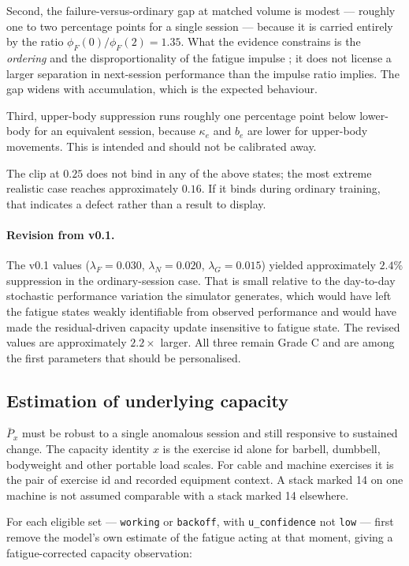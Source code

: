 \documentclass[11pt]{article}
\begin{document}
Second, the failure-versus-ordinary gap at matched volume is modest --- roughly one to two percentage points for a single session --- because it is carried entirely by the ratio $\phi_F(0)/\phi_F(2)=1.35$. What the evidence constrains is the \emph{ordering} and the disproportionality of the fatigue impulse \cite{moran2017}; it does not license a larger separation in next-session performance than the impulse ratio implies. The gap widens with accumulation, which is the expected behaviour.

Third, upper-body suppression runs roughly one percentage point below lower-body for an equivalent session, because $\kappa_e$ and $b_e$ are lower for upper-body movements. This is intended and should not be calibrated away.

The clip at $0.25$ does not bind in any of the above states; the most extreme realistic case reaches approximately $0.16$. If it binds during ordinary training, that indicates a defect rather than a result to display.

\paragraph{Revision from v0.1.} The v0.1 values ($\lambda_F=0.030$, $\lambda_N=0.020$, $\lambda_G=0.015$) yielded approximately $2.4\%$ suppression in the ordinary-session case. That is small relative to the day-to-day stochastic performance variation the simulator generates, which would have left the fatigue states weakly identifiable from observed performance and would have made the residual-driven capacity update insensitive to fatigue state. The revised values are approximately $2.2\times$ larger. All three remain Grade C and are among the first parameters that should be personalised.

\subsection{Estimation of underlying capacity}
\label{sec:capacity}

$\bar P_x$ must be robust to a single anomalous session and still responsive to
sustained change. The capacity identity $x$ is the exercise id alone for
barbell, dumbbell, bodyweight and other portable load scales. For cable and
machine exercises it is the pair of exercise id and recorded equipment
context. A stack marked 14 on one machine is not assumed comparable with a
stack marked 14 elsewhere.

For each eligible set --- \texttt{working} or \texttt{backoff}, with \texttt{u\_confidence} not \texttt{low} --- first remove the model's own estimate of the fatigue acting at that moment, giving a fatigue-corrected capacity observation:
\end{document}
